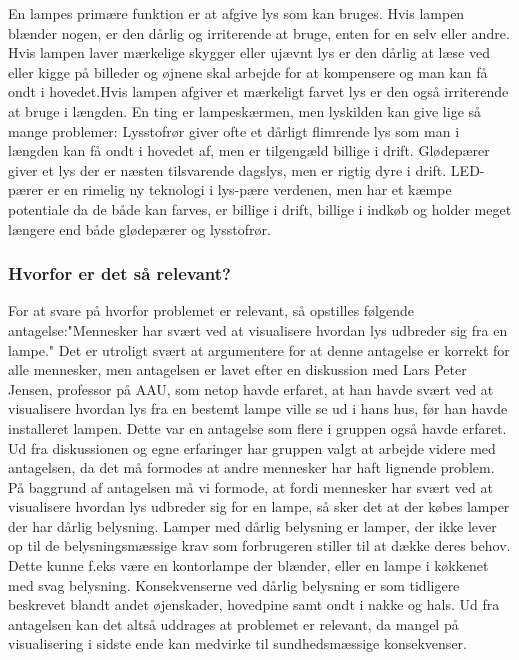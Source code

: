 En lampes primære funktion er at afgive lys som kan bruges. Hvis lampen blænder nogen, er den dårlig og irriterende at bruge, enten for en selv eller andre. Hvis lampen laver mærkelige skygger eller ujævnt lys er den dårlig at læse ved eller kigge på billeder og øjnene skal arbejde for at kompensere og man kan få ondt i hovedet\cite{lys_konsekvenser}.Hvis lampen afgiver et mærkeligt farvet lys er den også irriterende at bruge i længden.\newline
En ting er lampeskærmen, men lyskilden kan give lige så mange problemer:\newline
Lysstofrør giver ofte et dårligt flimrende lys som man i længden kan få ondt i hovedet af, men er tilgengæld billige i drift. Glødepærer giver et lys der er næsten tilsvarende dagslys, men er rigtig dyre i drift. LED-pærer er en rimelig ny teknologi i lys-pære verdenen, men har et kæmpe potentiale da de både kan farves, er billige i drift, billige i indkøb og holder meget længere end både glødepærer og lysstofrør\cite{videnskab_dk_led}.


\subsubsection{Hvorfor er det så relevant?}

For at svare på hvorfor problemet er relevant, så opstilles følgende antagelse:"Mennesker har svært ved at visualisere hvordan lys udbreder sig fra en lampe." Det er utroligt svært at argumentere for at denne antagelse er korrekt for alle mennesker, men antagelsen er lavet efter en diskussion med Lars Peter Jensen, professor på AAU, som netop havde erfaret, at han havde svært ved at visualisere hvordan lys fra en bestemt lampe ville se ud i hans hus, før han havde installeret lampen. Dette var en antagelse som flere i gruppen også havde erfaret. Ud fra diskussionen og egne erfaringer har gruppen valgt at arbejde videre med antagelsen, da det må formodes at andre mennesker har haft lignende problem. \newline
På baggrund af antagelsen må vi formode, at fordi mennesker har svært ved at visualisere hvordan lys udbreder sig for en lampe, så sker det at der købes lamper der har dårlig belysning. Lamper med dårlig belysning er lamper, der ikke lever op til de belysningsmæssige krav som forbrugeren stiller til at dække deres behov. Dette kunne f.eks være en kontorlampe der blænder, eller en lampe i køkkenet med svag belysning\cite{daarlig_belysning_konsekvenser}. Konsekvenserne ved dårlig belysning er som tidligere beskrevet blandt andet øjenskader, hovedpine samt ondt i nakke og hals. Ud fra antagelsen kan det altså uddrages at problemet er relevant, da mangel på visualisering i sidste ende kan medvirke til sundhedsmæssige konsekvenser.

